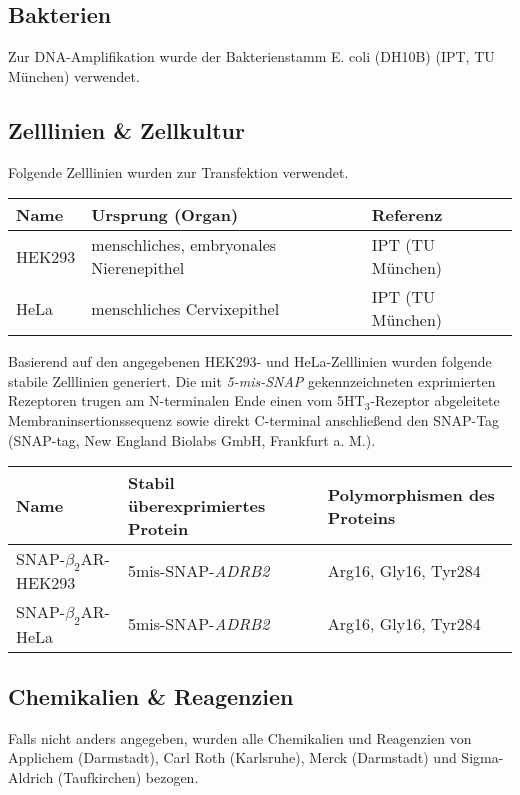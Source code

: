 \subsection{Bakterien}
Zur DNA-Amplifikation wurde der Bakterienstamm E. coli (DH10B) (IPT, TU München) verwendet.

\subsection{Zelllinien \& Zellkultur}
Folgende Zelllinien wurden zur Transfektion verwendet.

\begin{table}[htsp]
	\begin{tabular}{lll}
\toprule
Name		&	Ursprung (Organ)				&	Referenz\\
\midrule
HEK293		&	menschliches, embryonales Nierenepithel		&	IPT (TU München)\\
HeLa		&	menschliches Cervixepithel					&	IPT (TU München)\\
\bottomrule
\end {tabular}
\end{table}

Basierend auf den angegebenen HEK293- und HeLa-Zelllinien wurden folgende stabile Zelllinien generiert. Die mit \textit{5-mis-SNAP} gekennzeichneten exprimierten Rezeptoren trugen am N-terminalen Ende einen vom 5HT$_3$-Rezeptor abgeleitete Membraninsertionssequenz sowie direkt C-terminal anschließend den SNAP-Tag (SNAP-tag, New England Biolabs GmbH, Frankfurt a. M.). 

\begin{table}[htsb]
\begin{tabularx}{\textwidth}{lll}
\toprule
Name		&	Stabil überexprimiertes Protein	&	Polymorphismen des Proteins\\
\midrule
SNAP-$\beta_2$AR-HEK293		&	5mis-SNAP-\textit{ADRB2}		&	Arg16, Gly16, Tyr284\\
SNAP-$\beta_2$AR-HeLa		&	5mis-SNAP-\textit{ADRB2}		&	Arg16, Gly16, Tyr284\\
\bottomrule
\end{tabularx}
\end{table}

\subsection{Chemikalien \& Reagenzien}\label{chemikalien}
Falls nicht anders angegeben, wurden alle Chemikalien und Reagenzien von Applichem (Darmstadt), Carl Roth (Karlsruhe), Merck (Darmstadt) und Sigma-Aldrich (Taufkirchen) bezogen. 

